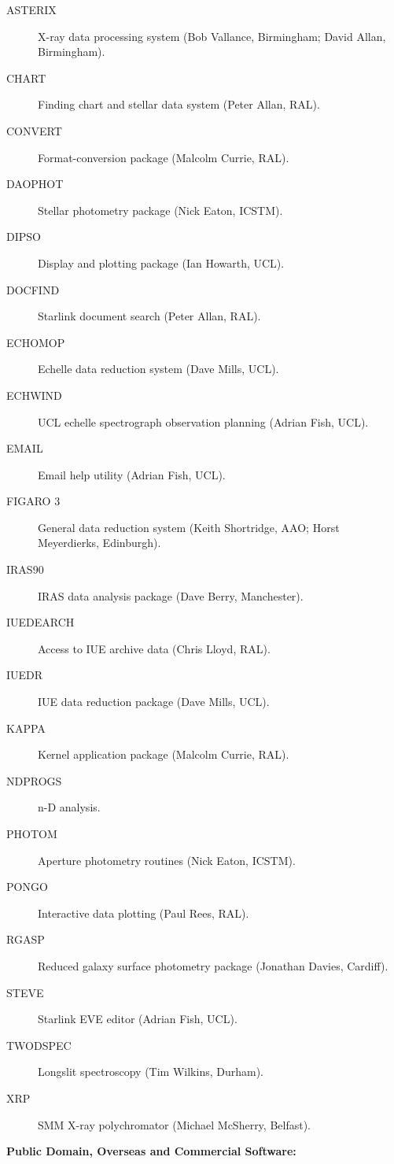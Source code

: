 \begin{description}
\item[ASTERIX] X-ray data processing system (Bob Vallance, Birmingham;
David Allan, Birmingham).
\item[CHART] Finding chart and stellar data system (Peter Allan, RAL).
\item[CONVERT] Format-conversion package (Malcolm Currie, RAL).
\item[DAOPHOT] Stellar photometry package (Nick Eaton, ICSTM).
\item[DIPSO] Display and plotting package (Ian Howarth, UCL).
\item[DOCFIND] Starlink document search (Peter Allan, RAL).
\item[ECHOMOP] Echelle data reduction system (Dave Mills, UCL).
\item[ECHWIND] UCL echelle spectrograph observation planning (Adrian Fish,
UCL).
\item[EMAIL] Email help utility (Adrian Fish, UCL).
\item[FIGARO 3] General data reduction system (Keith Shortridge, AAO; Horst
Meyerdierks, Edinburgh).
\item[IRAS90] IRAS data analysis package (Dave Berry, Manchester).
\item[IUEDEARCH] Access to IUE archive data (Chris Lloyd, RAL).
\item[IUEDR] IUE data reduction package (Dave Mills, UCL).
\item[KAPPA] Kernel application package (Malcolm Currie, RAL).
\item[NDPROGS] n-D analysis.
\item[PHOTOM] Aperture photometry routines (Nick Eaton, ICSTM).
\item[PONGO] Interactive data plotting (Paul Rees, RAL).
\item[RGASP] Reduced galaxy surface photometry package (Jonathan Davies,
Cardiff).
\item[STEVE] Starlink EVE editor (Adrian Fish, UCL).
\item[TWODSPEC] Longslit spectroscopy (Tim Wilkins, Durham).
\item[XRP] SMM X-ray polychromator (Michael McSherry, Belfast).
\end{description}


\vspace{5mm}
\begin{center}
{\bf Public Domain, Overseas and Commercial Software:}
\end{center}

